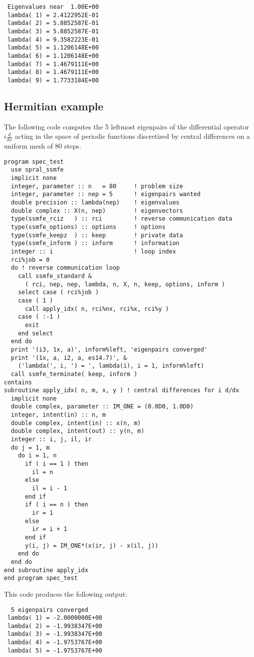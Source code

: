 \documentclass{spral}
\begin{document}
\begin{verbatim}
 Eigenvalues near  1.00E+00
 lambda( 1) = 2.4122952E-01
 lambda( 2) = 5.8852587E-01
 lambda( 3) = 5.8852587E-01
 lambda( 4) = 9.3582223E-01
 lambda( 5) = 1.1206148E+00
 lambda( 6) = 1.1206148E+00
 lambda( 7) = 1.4679111E+00
 lambda( 8) = 1.4679111E+00
 lambda( 9) = 1.7733184E+00
\end{verbatim}

\subsection{Hermitian example}
\label{sec:ex.h}

The following code 
computes the 5 leftmost eigenpairs of 
the differential operator $i \frac{d}{dx}$
acting in the space of periodic functions
discretized by central differences on a uniform mesh
of 80 steps.

\begin{verbatim}
program spec_test
  use spral_ssmfe
  implicit none
  integer, parameter :: n   = 80     ! problem size
  integer, parameter :: nep = 5      ! eigenpairs wanted
  double precision :: lambda(nep)    ! eigenvalues
  double complex :: X(n, nep)        ! eigenvectors
  type(ssmfe_rciz   ) :: rci         ! reverse communication data
  type(ssmfe_options) :: options     ! options
  type(ssmfe_keepz  ) :: keep        ! private data
  type(ssmfe_inform ) :: inform      ! information
  integer :: i                       ! loop index
  rci%job = 0
  do ! reverse communication loop
    call ssmfe_standard &
      ( rci, nep, nep, lambda, n, X, n, keep, options, inform )
    select case ( rci%job )
    case ( 1 )
      call apply_idx( n, rci%nx, rci%x, rci%y )
    case ( :-1 )
      exit
    end select
  end do
  print '(i3, 1x, a)', inform%left, 'eigenpairs converged'
  print '(1x, a, i2, a, es14.7)', &
    ('lambda(', i, ') = ', lambda(i), i = 1, inform%left)
  call ssmfe_terminate( keep, inform )
contains
subroutine apply_idx( n, m, x, y ) ! central differences for i d/dx
  implicit none
  double complex, parameter :: IM_ONE = (0.0D0, 1.0D0)
  integer, intent(in) :: n, m
  double complex, intent(in) :: x(n, m)
  double complex, intent(out) :: y(n, m)
  integer :: i, j, il, ir
  do j = 1, m
    do i = 1, n
      if ( i == 1 ) then
        il = n
      else
        il = i - 1
      end if
      if ( i == n ) then
        ir = 1
      else
        ir = i + 1
      end if
      y(i, j) = IM_ONE*(x(ir, j) - x(il, j))
    end do
  end do
end subroutine apply_idx
end program spec_test
\end{verbatim}

This code produces the following output:

\begin{verbatim}
  5 eigenpairs converged
 lambda( 1) = -2.0000000E+00
 lambda( 2) = -1.9938347E+00
 lambda( 3) = -1.9938347E+00
 lambda( 4) = -1.9753767E+00
 lambda( 5) = -1.9753767E+00
\end{verbatim}
\end{document}
